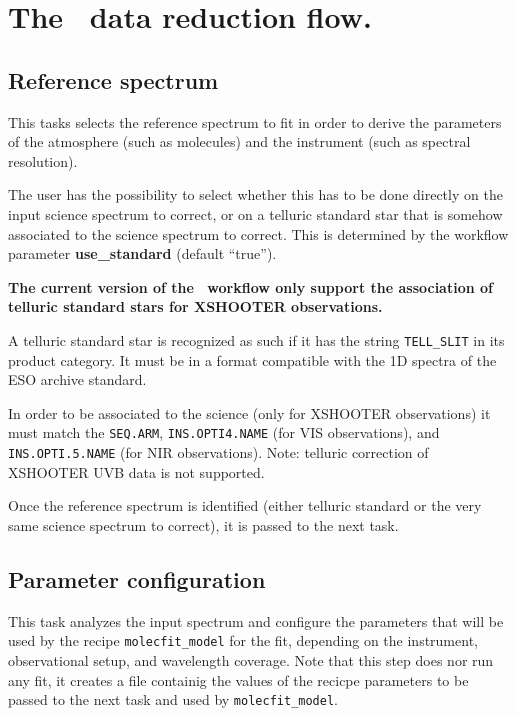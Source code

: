 \section{The \instname\ data reduction flow.}
\label{sec:reduction_flow}



\subsection{Reference spectrum}

This tasks selects the reference spectrum to fit in order to derive
the parameters of the atmosphere (such as molecules) and the
instrument (such as spectral resolution).

The user has the possibility to select whether this has to be done
directly on the input science spectrum to correct, or on a telluric
standard star that is somehow associated to the science spectrum to
correct. This is determined by the workflow parameter {\bf
use\_standard} (default ``true'').


{\bf The current version of the \wkfname\ workflow only support the
association of telluric standard stars for XSHOOTER observations.}

A telluric standard star is recognized as such if it has the string
{\tt TELL\_SLIT} in its product category. It must be in a format
compatible with the 1D spectra of the ESO archive standard.

In order to be associated to the science (only for XSHOOTER
observations) it must match the {\tt SEQ.ARM}, {\tt INS.OPTI4.NAME}
(for VIS observations), and {\tt INS.OPTI.5.NAME} (for NIR
observations). Note: telluric correction of XSHOOTER UVB data is not
supported.

Once the reference spectrum is identified (either telluric standard or
the very same science spectrum to correct), it is passed to the next
task.

\subsection{Parameter configuration}

This task analyzes the input spectrum and configure the parameters
that will be used by the recipe {\tt molecfit\_model} for the fit,
depending on the instrument, observational setup, and wavelength
coverage. Note that this step does nor run any fit, it creates a file
containig the values of the recicpe parameters to be passed to the
next task and used by {\tt molecfit\_model}.

